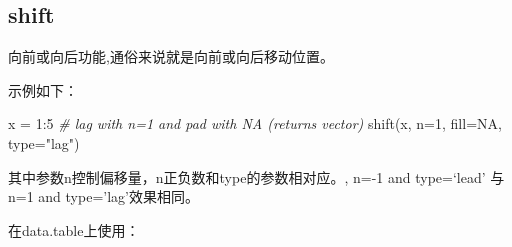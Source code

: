 \documentclass[
]{book}
\newenvironment{Shaded}{\begin{snugshade}}{\end{snugshade}}
\newcommand{\AttributeTok}[1]{\textcolor[rgb]{0.77,0.63,0.00}{#1}}
\newcommand{\CommentTok}[1]{\textcolor[rgb]{0.56,0.35,0.01}{\textit{#1}}}
\newcommand{\ConstantTok}[1]{\textcolor[rgb]{0.00,0.00,0.00}{#1}}
\newcommand{\DecValTok}[1]{\textcolor[rgb]{0.00,0.00,0.81}{#1}}
\newcommand{\FunctionTok}[1]{\textcolor[rgb]{0.00,0.00,0.00}{#1}}
\newcommand{\NormalTok}[1]{#1}
\newcommand{\OtherTok}[1]{\textcolor[rgb]{0.56,0.35,0.01}{#1}}
\newcommand{\SpecialCharTok}[1]{\textcolor[rgb]{0.00,0.00,0.00}{#1}}
\newcommand{\StringTok}[1]{\textcolor[rgb]{0.31,0.60,0.02}{#1}}
\begin{document}
\begin{Shaded}
\end{Shaded}

\hypertarget{shift}{%
\subsection{shift}\label{shift}}

向前或向后功能,通俗来说就是向前或向后移动位置。

示例如下：

\begin{Shaded}
\begin{Highlighting}[]
\NormalTok{x }\OtherTok{=} \DecValTok{1}\SpecialCharTok{:}\DecValTok{5}
\CommentTok{\# lag with n=1 and pad with NA (returns vector)}
\FunctionTok{shift}\NormalTok{(x, }\AttributeTok{n=}\DecValTok{1}\NormalTok{, }\AttributeTok{fill=}\ConstantTok{NA}\NormalTok{, }\AttributeTok{type=}\StringTok{"lag"}\NormalTok{)}
\end{Highlighting}
\end{Shaded}

其中参数n控制偏移量，n正负数和type的参数相对应。, n=-1 and type=`lead' 与 n=1 and type='lag'效果相同。

在data.table上使用：
\end{document}
